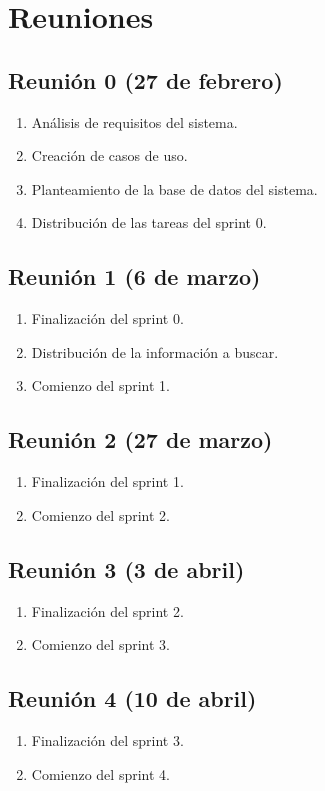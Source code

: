 \section{Reuniones}
\subsection{Reunión 0 (27 de febrero)}
\begin{enumerate}
	\item Análisis de requisitos del sistema.
	\item Creación de casos de uso.
	\item Planteamiento de la base de datos del sistema.
	\item Distribución de las tareas del sprint 0.
\end{enumerate}

\subsection{Reunión 1 (6 de marzo)}
\begin{enumerate}
	\item Finalización del sprint 0.
	\item Distribución de la información a buscar.
	\item Comienzo del sprint 1.
\end{enumerate}

\subsection{Reunión 2 (27 de marzo)}
\begin{enumerate}
	\item Finalización del sprint 1.
	\item Comienzo del sprint 2.
\end{enumerate}

\subsection{Reunión 3 (3 de abril)}
\begin{enumerate}
	\item Finalización del sprint 2.
	\item Comienzo del sprint 3.
\end{enumerate}

\subsection{Reunión 4 (10 de abril)}
\begin{enumerate}
	\item Finalización del sprint 3.
	\item Comienzo del sprint 4.
\end{enumerate}


